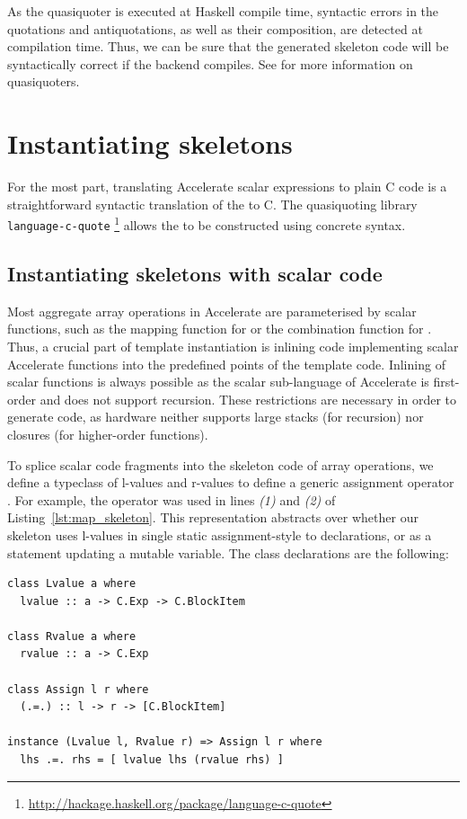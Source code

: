 As the quasiquoter \code{[cunit|...|]} is executed at Haskell compile time,
syntactic errors in the quotations and antiquotations, as well as their
composition, are detected at compilation time. Thus, we can be sure that the
generated skeleton code will be syntactically correct if the backend compiles.
See \cite{Mainland:2007bl} for more information on quasiquoters.


\section{Instantiating skeletons}

For the most part, translating Accelerate scalar expressions to plain \CUDA C
code is a straightforward syntactic translation of the  \AST
to C. The quasiquoting library \texttt{language-c-quote}%
\footnote{\url{http://hackage.haskell.org/package/language-c-quote}} allows the
\CUDA \AST to be constructed using concrete syntax.


\subsection{Instantiating skeletons with scalar code}

Most aggregate array operations in Accelerate are parameterised by scalar
functions, such as the mapping function for  or the combination
function for . Thus, a crucial part of template instantiation is
inlining \CUDA code implementing scalar Accelerate functions into the predefined
points of the template code. Inlining of scalar functions is always possible as
the scalar sub-language of Accelerate is first-order and does not support
recursion. These restrictions are necessary in order to generate \GPU code, as
\GPU hardware neither supports large stacks (for recursion) nor closures (for
higher-order functions).

To splice scalar code fragments into the skeleton code of array operations, we
define a typeclass of l-values and r-values to define a generic assignment
operator . For example, the operator was used in lines \emph{(1)}
and \emph{(2)} of Listing~\ref{lst:map_skeleton}. This representation abstracts
over whether our skeleton uses l-values in single static assignment-style to
 declarations, or as a statement updating a mutable variable. The
class declarations are the following:
%
\begin{lstlisting}[style=haskell]
class Lvalue a where
  lvalue :: a -> C.Exp -> C.BlockItem

class Rvalue a where
  rvalue :: a -> C.Exp

class Assign l r where
  (.=.) :: l -> r -> [C.BlockItem]

instance (Lvalue l, Rvalue r) => Assign l r where
  lhs .=. rhs = [ lvalue lhs (rvalue rhs) ]
\end{lstlisting}

